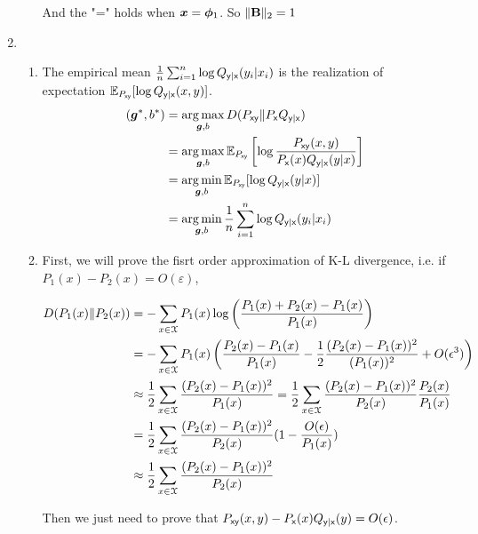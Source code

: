 \documentclass[a4paper]{article}
\begin{document}
\begin{enumerate}
\begin{enumerate}
    And the "=" holds when $\bm{x} = \bm{\phi}_1$.  So $\|\mathbf{B}\|_2 = 1$
  \end{enumerate}

  \item \begin{enumerate}
    \item The empirical mean $\frac{1}{n} \sum_{i=1}^n \log Q_{\mathsf{y} | \mathsf{x}} (y_i | x_i ) $ is the realization of expectation $ \operatorname{\mathbb{E}}_{P_{\mathsf{x}\mathsf{y}}}[\log Q_{\mathsf{y} | \mathsf{x}}(x,y)]$. \begin{equation}
      \begin{aligned}
        (\boldsymbol{g}^*,b^*) & = \operatorname*{arg\,max}_{\boldsymbol{g},b} D(P_{\mathsf{x}\mathsf{y}}\| P_{\mathsf{x}}Q_{\mathsf{y}|\mathsf{x}} ) \\
        & = \operatorname*{arg\,max}_{\boldsymbol{g},b} \operatorname{\mathbb{E}}_{P_{\mathsf{x}\mathsf{y}}} \left[ \log \frac{P_{\mathsf{x}\mathsf{y}}(x,y)}{P_{\mathsf{x}}(x)Q_{\mathsf{y}|\mathsf{x}}(y|x)}\right] \\
        & = \operatorname*{arg\,min}_{\boldsymbol{g},b} \operatorname{\mathbb{E}}_{P_{\mathsf{x}\mathsf{y}}}[\log Q_{\mathsf{y} | \mathsf{x}}(y|x)] \\
        & = \operatorname*{arg\,min}_{\boldsymbol{g},b} \frac{1}{n} \sum_{i=1}^n \log Q_{\mathsf{y} | \mathsf{x}} (y_i | x_i )
      \end{aligned}
    \end{equation}

    \item First, we will prove the fisrt order approximation of K-L divergence, i.e. if $P_1(x) -P_2(x) = O(\varepsilon) $,
    
    \begin{equation}
      \begin{aligned}
        D(P_1(x) \| P_2(x)) & = -\sum_{x \in \mathcal{X}} P_1(x) \log \left(\frac{P_1(x) + P_2(x) -P_1(x)}{P_1(x)}\right) \\
        & = - \sum_{x\in \mathcal{X}} P_1(x) \left( \frac{P_2(x)-P_1(x)}{P_1(x)} -\frac{1}{2} \frac{(P_2(x)-P_1(x))^2}{(P_1(x))^2} + O(\epsilon^3)\right) \\ 
        & \approx \frac{1}{2} \sum_{x\in \mathcal{X}} \frac{(P_2(x)-P_1(x))^2}{P_1(x)} = \frac{1}{2} \sum_{x\in \mathcal{X}} \frac{(P_2(x)-P_1(x))^2}{P_2(x)} \frac{P_2(x)}{P_1(x)}  \\
        & = \frac{1}{2} \sum_{x\in \mathcal{X}} \frac{(P_2(x)-P_1(x))^2}{P_2(x)}  ( 1- \frac{O(\epsilon)}{P_1(x)}) \\
        & \approx \frac{1}{2} \sum_{x\in \mathcal{X}} \frac{(P_2(x)-P_1(x))^2}{P_2(x)} 
      \end{aligned}
    \end{equation}

    Then we just need to prove that $P_{\mathsf{x}\mathsf{y}}(x,y) - P_{\mathsf{x}}(x)Q_{\mathsf{y}|\mathsf{x}}(y) = O(\epsilon)$.


\end{enumerate}
\end{enumerate}
\end{document}
